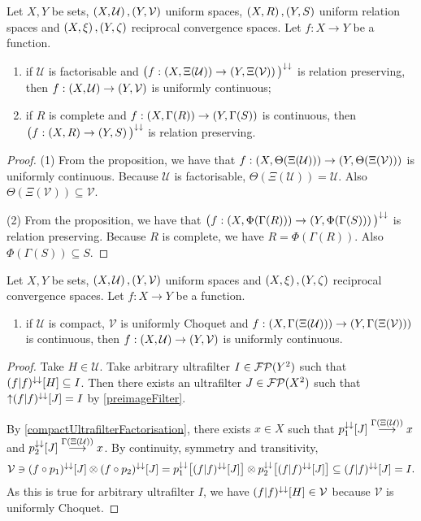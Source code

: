 \begin{corollary}
Let $X,Y$ be sets, $\left( X,\mathcal{U} \right), \left( Y,\mathcal{V} \right)$ uniform spaces, $\left( X,R \right), \left( Y,S \right)$ uniform relation spaces and $\left( X,\xi \right), \left( Y,\zeta \right)$ reciprocal convergence spaces. Let $f: X\to Y$ be a function.
\begin{enumerate}
\item if $\mathcal{U}$ is factorisable and $\big(f: \left( X,\Xi(\mathcal{U}) \right) \to \left( Y,\Xi(\mathcal{V}) \right)\big)^{\downarrow\downarrow}$ is relation preserving, then $f: \left( X,\mathcal{U} \right) \to \left( Y,\mathcal{V} \right)$ is uniformly continuous;
\item if $R$ is complete and $f: \left( X,\Gamma(R) \right) \to \left( Y,\Gamma(S) \right)$ is continuous, then $\big(f: \left( X,R \right) \to \left( Y,S \right)\big)^{\downarrow\downarrow}$ is relation preserving.
\end{enumerate}
\end{corollary}
\begin{proof}
(1) From the proposition, we have that $f: \left( X,\Theta(\Xi(\mathcal{U})) \right) \to \left( Y,\Theta(\Xi(\mathcal{V})) \right)$ is uniformly continuous. Because $\mathcal{U}$ is factorisable, $\Theta(\Xi(\mathcal{U})) = \mathcal{U}$. Also $\Theta(\Xi(\mathcal{V})) \subseteq \mathcal{V}$.

(2) From the proposition, we have that $\big(f: \left( X,\Phi(\Gamma(R)) \right) \to \left( Y,\Phi(\Gamma(S)) \right)\big)^{\downarrow\downarrow}$ is relation preserving. Because $R$ is complete, we have $R = \Phi(\Gamma(R))$. Also $\Phi(\Gamma(S)) \subseteq S$.
\end{proof}

\begin{proposition}
Let $X,Y$ be sets, $\left( X,\mathcal{U} \right), \left( Y,\mathcal{V} \right)$ uniform spaces and $\left( X,\xi \right), \left( Y,\zeta \right)$ reciprocal convergence spaces. Let $f: X\to Y$ be a function.
\begin{enumerate}
\item if $\mathcal{U}$ is compact, $\mathcal{V}$ is uniformly Choquet and $f: \left( X,\Gamma(\Xi(\mathcal{U})) \right) \to \left( Y,\Gamma(\Xi(\mathcal{V})) \right)$ is continuous, then $f: \left( X,\mathcal{U} \right) \to \left( Y,\mathcal{V} \right)$ is uniformly continuous.
\end{enumerate}
\end{proposition}
\begin{proof}
Take $H\in\mathcal{U}$. Take arbitrary ultrafilter $I\in\operatorname{\mathcal{FP}}(Y^2)$ such that $(f|f)^{\downarrow\downarrow}[H]\subseteq I$. Then there exists an ultrafilter $J\in \operatorname{\mathcal{FP}}(X^2)$ such that $\operatorname{\uparrow} (f|f)^{\downarrow\downarrow}[J] = I$ by \ref{preimageFilter}.

By \ref{compactUltrafilterFactorisation}, there exists $x\in X$ such that $p_1^{\downarrow\downarrow}[J]\overset{\Gamma(\Xi(\mathcal{U}))}{\longrightarrow} x$ and $p_2^{\downarrow\downarrow}[J]\overset{\Gamma(\Xi(\mathcal{U}))}{\longrightarrow} x$. By continuity, symmetry and transitivity,
\[ \mathcal{V} \ni (f\circ p_1)^{\downarrow\downarrow}[J]\otimes (f\circ p_2)^{\downarrow\downarrow}[J] = p_1^{\downarrow\downarrow}\big[(f|f)^{\downarrow\downarrow}[J]\big]\otimes p_2^{\downarrow\downarrow}\big[(f|f)^{\downarrow\downarrow}[J]\big] \subseteq (f|f)^{\downarrow\downarrow}[J] = I. \]
As this is true for arbitrary ultrafilter $I$, we have $(f|f)^{\downarrow\downarrow}[H]\in\mathcal{V}$ because $\mathcal{V}$ is uniformly Choquet.
\end{proof}

